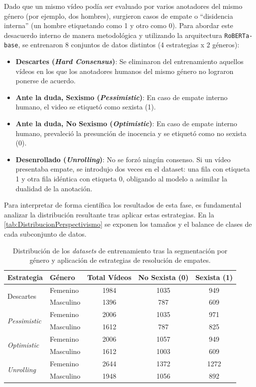 Dado que un mismo vídeo podía ser evaluado por varios anotadores del mismo género (por ejemplo, dos hombres), surgieron casos de empate o ``disidencia interna'' (un hombre etiquetando como 1 y otro como 0). Para abordar este desacuerdo interno de manera metodológica y utilizando la arquitectura \texttt{RoBERTa-base}, se entrenaron 8 conjuntos de datos distintos (4 estrategias x 2 géneros): 
\begin{itemize}
    \item \textbf{Descartes (\textit{Hard Consensus})}: Se eliminaron del entrenamiento aquellos vídeos en los que los anotadores humanos del mismo género no lograron ponerse de acuerdo. 
    \item \textbf{Ante la duda, Sexismo (\textit{Pessimistic})}: En caso de empate interno humano, el video se etiquetó como sexista (1).
    \item \textbf{Ante la duda, No Sexismo (\textit{Optimistic})}: En caso de empate interno humano, prevaleció la presunción de inocencia y se etiquetó como no sexista (0).
    \item \textbf{Desenrollado (\textit{Unrolling})}: No se forzó ningún consenso. Si un vídeo presentaba empate, se introdujo dos veces en el dataset: una fila con etiqueta 1 y otra fila idéntica con etiqueta 0, obligando al modelo a asimilar la dualidad de la anotación.
\end{itemize}

Para interpretar de forma científica los resultados de esta fase, es fundamental analizar la distribución resultante tras aplicar estas estrategias. En la \autoref{tab:DistribucionPerspectivismo} se exponen los tamaños y el balance de clases de cada subconjunto de datos.

\begin{table}[H]
    \centering
    \begin{tabular}{llccc}
    \toprule
    \textbf{Estrategia} & \textbf{Género} & \textbf{Total Vídeos} & \textbf{No Sexista (0)} & \textbf{Sexista (1)} \\
    \midrule
    \multirow{2}{*}{Descartes} & Femenino & 1984 & 1035 & 949 \\
    & Masculino & 1396 & 787 & 609 \\
    \midrule
    \multirow{2}{*}{\textit{Pessimistic}} & Femenino & 2006 & 1035 & 971 \\
    & Masculino & 1612 & 787 & 825 \\
    \midrule
    \multirow{2}{*}{\textit{Optimistic}} & Femenino & 2006 & 1057 & 949 \\
    & Masculino & 1612 & 1003 & 609 \\
    \midrule
    \multirow{2}{*}{\textit{Unrolling}} & Femenino & 2644 & 1372 & 1272 \\
    & Masculino & 1948 & 1056 & 892 \\
    \bottomrule
    \end{tabular}
    \caption{Distribución de los \textit{datasets} de entrenamiento tras la segmentación por género y aplicación de estrategias de resolución de empates.}
    \label{tab:DistribucionPerspectivismo}
\end{table}

